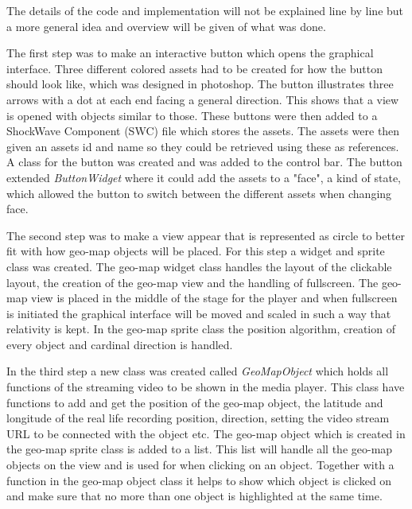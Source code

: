 The details of the code and implementation will not be explained line by line but a more general idea and overview will be given of what was done.

The first step was to make an interactive button which opens the graphical interface. Three different colored assets had to be created for how the button should look like, which was designed in photoshop. The button illustrates three arrows with a dot at each end facing a general direction. This shows that a view is opened with objects similar to those. These buttons were then added to a ShockWave Component (SWC) file which stores the assets. The assets were then given an assets id and name so they could be retrieved using these as references. A class for the button was created and was added to the control bar. The button extended \textit{ButtonWidget} where it could add the assets to a "face", a kind of state, which allowed the button to switch between the different assets when changing face. 

The second step was to make a view appear that is represented as circle to better fit with how geo-map objects will be placed. For this step a widget and sprite class was created. The geo-map widget class handles the layout of the clickable layout, the creation of the geo-map view and the handling of fullscreen. The geo-map view is placed in the middle of the stage for the player and when fullscreen is initiated the graphical interface will be moved and scaled in such a way that relativity is kept. In the geo-map sprite class the position algorithm, creation of every object and cardinal direction is handled.

In the third step a new class was created called \textit{GeoMapObject} which holds all functions of the streaming video to be shown in the media player. This class have functions to add and get the position of the geo-map object, the latitude and longitude of the real life recording position, direction, setting the video stream URL to be connected with the object etc. The geo-map object which is created in the geo-map sprite class is added to a list. This list will handle all the geo-map objects on the view and is used for when clicking on an object. Together with a function in the geo-map object class it helps to show which object is clicked on and make sure that no more than one object is highlighted at the same time.

